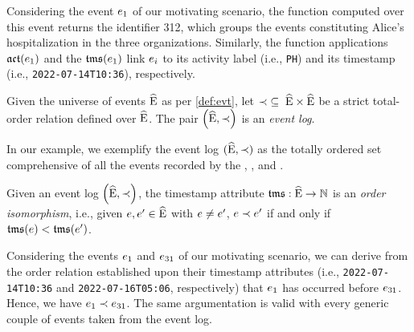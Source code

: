 \begin{newj}
%
Considering the event $e_1$ of our motivating scenario, the {\CIdF} function computed over this event returns the identifier 312, which groups the events constituting Alice's hospitalization in the three organizations. Similarly, the function applications {$\mathfrak{act}(e_1)$} and the {$\mathfrak{tms}(e_1)$} link $e_i$ to its activity label (i.e., \texttt{PH}) and its timestamp (i.e., \texttt{2022-07-14T10:36}), respectively.
%
\begin{definition}\label{def:evt:log}
	Given the universe of events $\widehat{\mathrm{E}}$ as per \cref{def:evt}, let ${\prec \;\subseteq\; \widehat{\mathrm{E}} \times \widehat{\mathrm{E}}}$ be a strict total-order relation defined over $\widehat{\mathrm{E}}$.
	The pair $\left( \widehat{\mathrm{E}}, \prec \right)$ is an \emph{event log}.
\end{definition}
In our example, we exemplify the event log $(\widehat{\mathrm{E}},\prec)$ as the totally ordered set comprehensive of all the events recorded by the , , and .
%
\begin{assumption}\label{asm:order:timestamp}
	Given an event log $\left( \widehat{\mathrm{E}}, \prec \right)$, the timestamp attribute $\mathfrak{tms}: \widehat{\mathrm{E}} \to \mathbb{N}$ is an \textit{order isomorphism}, i.e., given $e, e' \in \widehat{\mathrm{E}}$ with $e \neq e'$, $e \prec e'$ if and only if $\mathfrak{tms}(e) < \mathfrak{tms}(e')$.
\end{assumption}
%
Considering the events $e_{1}$ and $e_{31}$ of our motivating scenario, we can derive from the order relation established upon their timestamp attributes (i.e., \texttt{2022-07-14T10:36} and \texttt{2022-07-16T05:06}, respectively) that $e_{1}$ has occurred before $e_{31}$. Hence, we have  ${e_1}\prec{\ensuremath{e}_{31}}$. The same argumentation is valid with every generic couple of events taken from the event log.
%


\end{newj}

